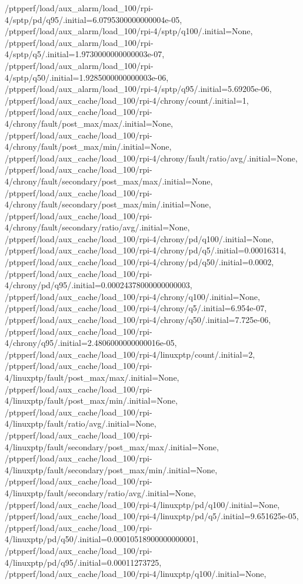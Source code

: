 {    /ptpperf/load/aux_alarm/load_100/rpi-4/sptp/pd/q95/.initial=6.0795300000000004e-05,
    /ptpperf/load/aux_alarm/load_100/rpi-4/sptp/q100/.initial=None,
    /ptpperf/load/aux_alarm/load_100/rpi-4/sptp/q5/.initial=1.9730000000000003e-07,
    /ptpperf/load/aux_alarm/load_100/rpi-4/sptp/q50/.initial=1.9285000000000003e-06,
    /ptpperf/load/aux_alarm/load_100/rpi-4/sptp/q95/.initial=5.69205e-06,
    /ptpperf/load/aux_cache/load_100/rpi-4/chrony/count/.initial=1,
    /ptpperf/load/aux_cache/load_100/rpi-4/chrony/fault/post_max/max/.initial=None,
    /ptpperf/load/aux_cache/load_100/rpi-4/chrony/fault/post_max/min/.initial=None,
    /ptpperf/load/aux_cache/load_100/rpi-4/chrony/fault/ratio/avg/.initial=None,
    /ptpperf/load/aux_cache/load_100/rpi-4/chrony/fault/secondary/post_max/max/.initial=None,
    /ptpperf/load/aux_cache/load_100/rpi-4/chrony/fault/secondary/post_max/min/.initial=None,
    /ptpperf/load/aux_cache/load_100/rpi-4/chrony/fault/secondary/ratio/avg/.initial=None,
    /ptpperf/load/aux_cache/load_100/rpi-4/chrony/pd/q100/.initial=None,
    /ptpperf/load/aux_cache/load_100/rpi-4/chrony/pd/q5/.initial=0.00016314,
    /ptpperf/load/aux_cache/load_100/rpi-4/chrony/pd/q50/.initial=0.0002,
    /ptpperf/load/aux_cache/load_100/rpi-4/chrony/pd/q95/.initial=0.00024378000000000003,
    /ptpperf/load/aux_cache/load_100/rpi-4/chrony/q100/.initial=None,
    /ptpperf/load/aux_cache/load_100/rpi-4/chrony/q5/.initial=6.954e-07,
    /ptpperf/load/aux_cache/load_100/rpi-4/chrony/q50/.initial=7.725e-06,
    /ptpperf/load/aux_cache/load_100/rpi-4/chrony/q95/.initial=2.4806000000000016e-05,
    /ptpperf/load/aux_cache/load_100/rpi-4/linuxptp/count/.initial=2,
    /ptpperf/load/aux_cache/load_100/rpi-4/linuxptp/fault/post_max/max/.initial=None,
    /ptpperf/load/aux_cache/load_100/rpi-4/linuxptp/fault/post_max/min/.initial=None,
    /ptpperf/load/aux_cache/load_100/rpi-4/linuxptp/fault/ratio/avg/.initial=None,
    /ptpperf/load/aux_cache/load_100/rpi-4/linuxptp/fault/secondary/post_max/max/.initial=None,
    /ptpperf/load/aux_cache/load_100/rpi-4/linuxptp/fault/secondary/post_max/min/.initial=None,
    /ptpperf/load/aux_cache/load_100/rpi-4/linuxptp/fault/secondary/ratio/avg/.initial=None,
    /ptpperf/load/aux_cache/load_100/rpi-4/linuxptp/pd/q100/.initial=None,
    /ptpperf/load/aux_cache/load_100/rpi-4/linuxptp/pd/q5/.initial=9.651625e-05,
    /ptpperf/load/aux_cache/load_100/rpi-4/linuxptp/pd/q50/.initial=0.00010518900000000001,
    /ptpperf/load/aux_cache/load_100/rpi-4/linuxptp/pd/q95/.initial=0.00011273725,
    /ptpperf/load/aux_cache/load_100/rpi-4/linuxptp/q100/.initial=None,
}
